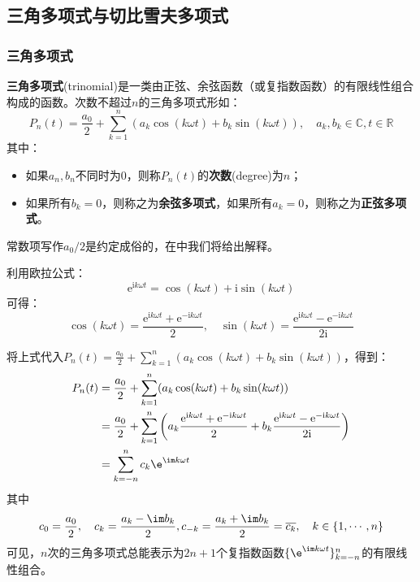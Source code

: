 \subsection{三角多项式与切比雪夫多项式}\label{sub:chebychev_polynomial}

\subsubsection{三角多项式}

\begin{definition}[三角多项式]\label{def:trinomial}
    \textbf{三角多项式}(trinomial)是一类由正弦、余弦函数（或复指数函数）的有限线性组合构成的函数。次数不超过$n$的三角多项式形如：
    $$P_n(t)=\frac{a_0}{2}+\sum_{k=1}^n(a_k\cos(k\omega t)+b_k\sin(k\omega t)),\quad a_k,b_k\in\mathbb{C} ,t\in\mathbb{R} $$
    其中：\begin{itemize}
        \item 如果$a_n,b_n$不同时为0，则称$P_n(t)$的\textbf{次数}(degree)为$n$；
        \item 如果所有$b_k=0$，则称之为\textbf{余弦多项式}，如果所有$a_k=0$，则称之为\textbf{正弦多项式}。
    \end{itemize}
    常数项写作$a_0/2$是约定成俗的，在中我们将给出解释。
\end{definition}

利用欧拉公式：
$$\mathrm{e}^{\mathrm{i}k\omega t}=\cos(k\omega t)+\mathrm{i}\sin(k\omega t)$$
可得：
\[\cos(k\omega t)=\frac{\mathrm{e}^{\mathrm{i}k\omega t}+\mathrm{e}^{-\mathrm{i}k\omega t}}{2},\quad \sin(k\omega t)=\frac{\mathrm{e}^{\mathrm{i}k\omega t}-\mathrm{e}^{-\mathrm{i}k\omega t}}{2\mathrm{i}}\]

将上式代入$P_n(t)=\frac{a_0}{2}+\sum_{k=1}^n(a_k\cos(k\omega t)+b_k\sin(k\omega t))$，得到：
\begin{align*}
    P_n(t)&=\frac{a_0}{2}+\sum_{k=1}^n(a_k\cos(k\omega t)+b_k\sin(k\omega t))\\
    &=\frac{a_0}{2}+\sum_{k=1}^n\left(a_k\frac{\mathrm{e}^{\mathrm{i}k\omega t}+\mathrm{e}^{-\mathrm{i}k\omega t}}{2}+b_k\frac{\mathrm{e}^{\mathrm{i}k\omega t}-\mathrm{e}^{-\mathrm{i}k\omega t}}{2\mathrm{i}}\right)\\
    &=\sum_{k=-n}^n c_k\e^{\im k\omega t}
\end{align*}
其中
$$c_0=\frac{a_0}{2},\quad c_k=\frac{a_k-\im b_k}{2},c_{-k}=\frac{a_k+\im b_k}{2}=\overline{c_k},\quad k\in\{1,\cdots,n\}$$
可见，$n$次的三角多项式总能表示为$2n+1$个复指数函数$\{\e^{\im k\omega t}\}_{k=-n}^n$的有限线性组合。

